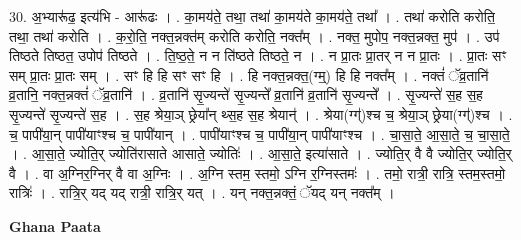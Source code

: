 \documentclass[17pt]{extarticle}
\begin{document}
30. अ॒भ्यारू॑ढ॒ इत्य॑भि - आरू॑ढः । . का॒मय॑ते॒ तथा॒ तथा॑ का॒मय॑ते का॒मय॑ते॒ तथा᳚ । . तथा॑ करोति करोति॒ तथा॒ तथा॑ करोति । . क॒रो॒ति॒ नक्त॒न्नक्त॑म् करोति करोति॒ नक्त᳚म् । . नक्त॒ मुपोप॒ नक्त॒न्नक्त॒ मुप॑ । . उप॑ तिष्ठते तिष्ठत॒ उपोप॑ तिष्ठते । . ति॒ष्ठ॒ते॒ न न ति॑ष्ठते तिष्ठते॒ न । . न प्रा॒तः प्रा॒तर् न न प्रा॒तः । . प्रा॒तः सꣳ सम् प्रा॒तः प्रा॒तः सम् । . सꣳ हि हि सꣳ सꣳ हि । . हि नक्त॒न्नक्त॒(ग्म्॒) हि हि नक्त᳚म् । . नक्तं॑ ॅव्र॒तानि॑ व्र॒तानि॒ नक्त॒न्नक्तं॑ ॅव्र॒तानि॑ । . व्र॒तानि॑ सृ॒ज्यन्ते॑ सृ॒ज्यन्ते᳚ व्र॒तानि॑ व्र॒तानि॑ सृ॒ज्यन्ते᳚ । . सृ॒ज्यन्ते॑ स॒ह स॒ह सृ॒ज्यन्ते॑ सृ॒ज्यन्ते॑ स॒ह । . स॒ह श्रेया॒ञ् छ्रेया᳚न् थ्स॒ह स॒ह श्रेयान्॑ । . श्रेया(ग्ग्॑)श्च च॒ श्रेया॒ञ् छ्रेया(ग्ग्॑)श्च । . च॒ पापी॑या॒न् पापी॑याꣳश्च च॒ पापी॑यान् । . पापी॑याꣳश्च च॒ पापी॑या॒न् पापी॑याꣳश्च । . चा॒सा॒ते॒ आ॒सा॒ते॒ च॒ चा॒सा॒ते॒ । . आ॒सा॒ते॒ ज्योति॒र् ज्योति॑रासाते आसाते॒ ज्योतिः॑ । . आ॒सा॒ते॒ इत्या॑साते । . ज्योति॒र् वै वै ज्योति॒र् ज्योति॒र् वै । . वा अ॒ग्निर॒ग्निर् वै वा अ॒ग्निः । . अ॒ग्नि स्तम॒ स्तमो॒ ऽग्नि र॒ग्निस्तमः॑ । . तमो॒ रात्री॒ रात्रि॒ स्तम॒स्तमो॒ रात्रिः॑ । . रात्रि॒र् यद् यद् रात्री॒ रात्रि॒र् यत् । . यन् नक्त॒न्नक्तं॒ ॅयद् यन् नक्त᳚म् । \newline

\textbf{Ghana Paata } \newline
\end{document}
